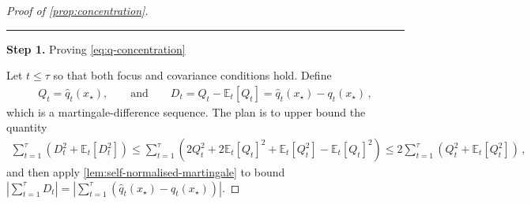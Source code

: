 \documentclass[11pt]{article}
\newcommand{\proofstep}[2]{%
    \par\medskip
    \noindent
    \textcolor{blue!55!black}{\rule{2pt}{1.2em}}%
    \hspace{0.6em}%
    {\sffamily\bfseries\color{blue!55!black}Step #1}%
    \quad
    {\sffamily #2}%
    \par\smallskip
}
\newcommand{\E}{\mathbb E}
\newcommand{\1}{\mathbf 1}
\begin{document}
\begin{proof}[Proof of \cref{prop:concentration}]
    \proofstep{1.}{Proving \eqref{eq:q-concentration}}
    Let $t\leq\tau$ so that both focus and covariance conditions hold.
    Define
    \begin{align}
        Q_t
        =\widehat q_t(x_\star),
        \qquad\text{and}\qquad
        D_t
        =Q_t-\E_t[Q_t]
        =\widehat q_t(x_\star)-q_t(x_\star)
        \,,
    \end{align}
    which is a martingale-difference sequence.
    The plan is to upper bound the quantity
    \begin{align}
        \sum_{t=1}^\tau
        \left(D_t^2 + \E_t[D_t^2]\right)
        \leq
        \sum_{t=1}^\tau
        \left(
        2Q_t^2 + 2\E_t[Q_t]^2 +
        \E_t[Q_t^2] - \E_t[Q_t]^2
        \right)
        \leq
        2
        \sum_{t=1}^\tau
        \left(
        Q_t^2 + \E_t[Q_t^2]
        \right)
        \,,
        \label{eq:D-to-Q}
    \end{align}
    and then apply \cref{lem:self-normalised-martingale} to bound $\left|\sum_{t=1}^\tau D_t\right| = \left|\sum_{t=1}^\tau (\widehat q_t(x_\star) - q_t(x_\star))\right|$.


\end{proof}
\end{document}

